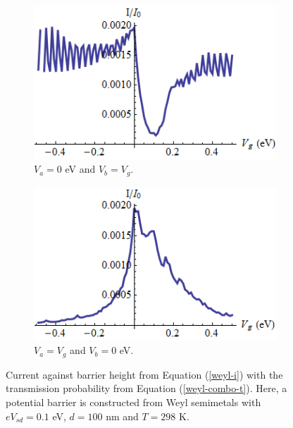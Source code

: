 		\begin{figure}[h]
			\begin{subfigure}[h]{0.5\textwidth}
				\centerline{\includegraphics[scale=0.55]{images/weyl-i-1}}
				\caption{$V_{a}=0$ eV and $V_{b}=V_{g}$.}
			\end{subfigure}
			\hspace{0.5cm}
			\begin{subfigure}[h]{0.5\textwidth}
				\centerline{\includegraphics[scale=0.55]{images/weyl-i-2}}
				\caption{$V_{a}=V_{g}$ and  $V_{b}=0$ eV.}
			\end{subfigure}
			\caption{Current against barrier height from Equation (\ref{weyl-i}) with the transmission probability from Equation (\ref{weyl-combo-t}). Here, a potential barrier is constructed from Weyl semimetals with $eV_{sd}=0.1$ eV, $d=100$ nm and $T=298$ K.}
			\label{weyl-vg-1}
		\end{figure}	
		
